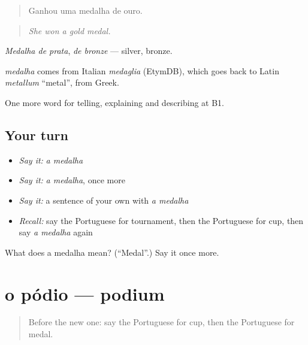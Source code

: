 \begin{quote}
Ganhou uma medalha de ouro.
\end{quote}

\begin{quote}
\emph{She won a gold medal.}
\end{quote}

\emph{Medalha de prata}, \emph{de bronze} — silver, bronze.

\begin{cousinweb}
\emph{medalha} comes from Italian \emph{medaglia} (EtymDB), which goes back to Latin \emph{metallum} \textquotedblleft{}metal\textquotedblright{}, from Greek.
\end{cousinweb}

\begin{grammarlens}[title={What you've built}]
One more word for telling, explaining and describing at B1.
\end{grammarlens}

\subsection*{Your turn}
\begin{itemize}
\raggedright
  \item \emph{Say it:} \emph{a medalha}
  \item \emph{Say it:} \emph{a medalha}, once more
  \item \emph{Say it:} a sentence of your own with \emph{a medalha}
  \item \emph{Recall:} say the Portuguese for tournament, then the Portuguese for cup, then say \emph{a medalha} again
\end{itemize}

\begin{tcolorbox}[breakable,colback=teal!4,colframe=teal!35!black,title={Before you move on}]
What does a medalha mean? (\textquotedblleft{}Medal\textquotedblright{}.) Say it once more.
\end{tcolorbox}
\section[o pódio]{o pódio — podium}

\label{lesson:PT-C511-podio}



\begin{quote}
Before the new one: say the Portuguese for cup, then the Portuguese for medal.
\end{quote}

